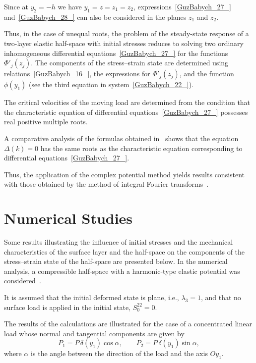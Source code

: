 Since at $y_2=-h$ we have $y_1=z=z_1=z_2$, expressions~\eqref{GuzBabych_27_} and~\eqref{GuzBabych_28_} can also be considered in the planes $z_1$ and $z_2$.

Thus, in the case of unequal roots, the problem of the steady-state response of a two-layer elastic half-space with initial stresses reduces to solving two ordinary inhomogeneous differential equations~\eqref{GuzBabych_27_} for the functions $\Phi'_j(z_j)$. The components of the stress--strain state are determined using relations~\eqref{GuzBabych_16_}, the expressions for $\Phi'_j(z_j)$, and the function $\phi(y_1)$ (see the third equation in system~\eqref{GuzBabych_22_}).

The critical velocities of the moving load are determined from the condition that the characteristic equation of differential equations~\eqref{GuzBabych_27_} possesses real positive multiple roots.

A comparative analysis of the formulas obtained in~\cite{GuzBabych2,GuzBabych10} shows that the equation $\Delta(k)=0$ has the same roots as the characteristic equation corresponding to differential equations~\eqref{GuzBabych_27_}.

Thus, the application of the complex potential method yields results consistent with those obtained by the method of integral Fourier transforms~\cite{GuzBabych2,GuzBabych10}.

\section{Numerical Studies}

Some results illustrating the influence of initial stresses and the mechanical characteristics of the surface layer and the half-space on the components of the stress--strain state of the half-space are presented below. In the numerical analysis, a compressible half-space with a harmonic-type elastic potential was considered~\cite{GuzBabych9,GuzBabych10}.

It is assumed that the initial deformed state is plane, i.e., $\lambda_3 = 1$, and that no surface load is applied in the initial state, $S_{0}^{22} = 0$.

The results of the calculations are illustrated for the case of a concentrated linear load whose normal and tangential components are given by
\[
P_{1} = P\,\delta(y_{1})\cos\alpha,
\qquad
P_{2} = P\,\delta(y_{1})\sin\alpha,
\]
where $\alpha$ is the angle between the direction of the load and the axis $Oy_{1}$.

